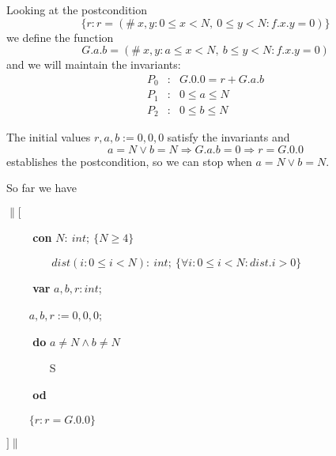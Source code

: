 \noindent Looking at the postcondition 
\begin{equation*}
\{r: r = (\#\ x, y: 0 \leq x < N,\  0 \leq y < N: f.x.y = 0) \}
\end{equation*}
 we define the function
 \begin{equation*}
 G.a.b = (\#\ x, y: a \leq x < N,\  b \leq y < N: f.x.y = 0)
\end{equation*}
and we will maintain the invariants:
\begin{equation*}
\begin{array}{lcl}
     P_0 &:& G.0.0 = r + G.a.b \\      
     P_1 &:& 0 \leq a \leq N\\
     P_2 &:& 0 \leq b \leq N
   \end{array}
\end{equation*}

\noindent The initial values $r, a, b := 0, 0, 0$ satisfy  the invariants and
\begin{equation*}
a = N \vee b = N \Rightarrow G.a.b = 0 \Rightarrow r = G.0.0
\end{equation*}
establishes the postcondition, so we can stop when $a = N \vee b = N$.

\noindent So far we have\medskip

$\|[$

\verb|    | \textbf{con} $N:\ int;\ \{N \geq 4\}$

\verb|        | $dist(i: 0 \leq i < N):\ int;\ \{\forall i: 0 \leq i < N: dist.i > 0\}$

\verb|    | \textbf{var} $a, b, r: int$;

\verb|    | $a, b, r := 0, 0, 0$;

\verb|    | \textbf{do} $a \neq N \wedge b \neq N$

\verb|       | S

\verb|    | \textbf{od}

\verb|    | $\{r: r = G.0.0 \}$

$]\|$

\medskip

